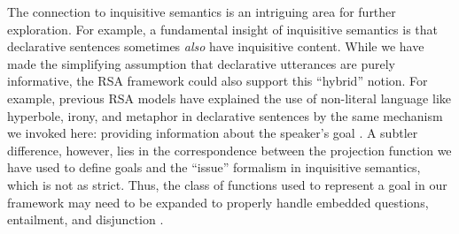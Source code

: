 \documentclass[11pt, floatsintext]{apa6}
\begin{document}
The connection to inquisitive semantics is an intriguing area for further exploration. %
For example, a fundamental insight of inquisitive semantics is that declarative sentences sometimes \emph{also} have inquisitive content.
While we have made the simplifying assumption that declarative utterances are purely informative, the RSA framework could also support this ``hybrid'' notion.
For example, previous RSA models have explained the use of non-literal language like hyperbole, irony, and metaphor in declarative sentences by the same mechanism we invoked here: providing information about the speaker's goal \cite{KaoEtAl2014-Cogsci,KaoGoodman15_IronyCogSci,KaoWuBergenGoodman14_NonliteralNumberWords}.
A subtler difference, however, lies in the correspondence between the projection function we have used to define goals and the ``issue'' formalism in inquisitive semantics, which is not as strict. 
Thus, the class of functions used to represent a goal in our framework may need to be expanded to properly handle embedded questions, entailment, and disjunction \cite{ciardelli2018inquisitive}.



\end{document}
